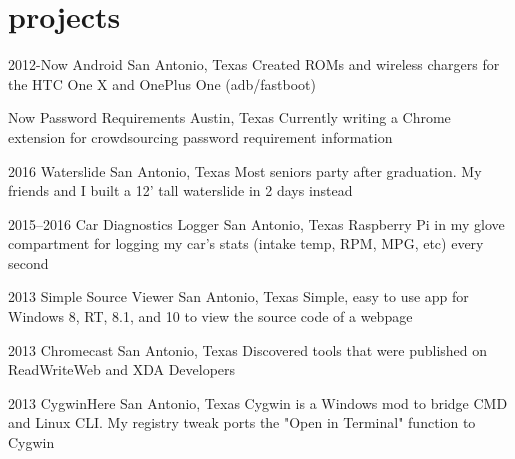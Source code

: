\documentclass[]{friggeri-cv} %
\begin{document}
\vspace{-.5pt}


\section{projects}

\begin{entrylist}

	\entry
	{2012-Now}
	{Android}
	{San Antonio, Texas}
	{Created ROMs and wireless chargers for the HTC One X and OnePlus One (adb/fastboot)}


	\entry
	{Now}
	{Password Requirements}
	{Austin, Texas}
	{Currently writing a Chrome extension for crowdsourcing password requirement information}


	\entry
	{2016}
	{Waterslide}
	{San Antonio, Texas}
	{Most seniors party after graduation. My friends and I built a 12' tall waterslide in 2 days instead}


	\entry
	{2015--2016}
	{Car Diagnostics Logger}
	{San Antonio, Texas}
	{Raspberry Pi in my glove compartment for logging my car's stats (intake temp, RPM, MPG, etc) every  second}


	\entry
	{2013}
	{Simple Source Viewer}
	{San Antonio, Texas}
	{Simple, easy to use app for Windows 8, RT, 8.1, and 10 to view the source code of a webpage}


	\entry
	{2013}
	{Chromecast}
	{San Antonio, Texas}
	{Discovered tools that were published on ReadWriteWeb and XDA Developers}


	\entry
	{2013}
	{CygwinHere}
	{San Antonio, Texas}
	{Cygwin is a Windows mod to bridge CMD and Linux CLI. My registry tweak ports the "Open in Terminal" function to Cygwin}

\end{entrylist}
\end{document}
